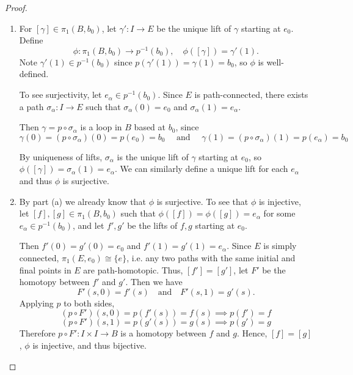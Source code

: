 \documentclass[12pt]{amsart}
\begin{document}
\begin{proof}
    \bbni
    \begin{enumerate}
        \item [(a)] For $[\gamma] \in \pi_1(B, b_0)$, let $\gamma' : I \to E$ be the unique lift of $\gamma$ starting at $e_0$. Define
        \[
            \phi: \pi_1(B, b_0) \to p^{-1}(b_0), \quad \phi([\gamma])
            = \gamma'(1).
        \]
        Note $\gamma'(1) \in p^{-1}(b_0)$ since $p(\gamma'(1)) = \gamma(1)
        = b_0$, so $\phi$ is well-defined.

        

        To see surjectivity, let $e_\alpha \in p^{-1}(b_0)$. Since $E$ is path-connected, there exists a path $\sigma_\alpha: I \to E$ such that $\sigma_\alpha(0) = e_0$ and $\sigma_\alpha(1) = e_\alpha$. 
        
        Then $\gamma = p \circ \sigma_\alpha$ is a loop in $B$ based at $b_0$, since 
        \[\gamma(0) = (p \circ \sigma_\alpha) (0) = p(e_0) = b_0 \quad \text{ and } \quad \gamma(1) = (p \circ \sigma_\alpha) (1) = p(e_\alpha) = b_0\]
       
        By uniqueness of lifts, $\sigma_\alpha$ is the unique lift of $\gamma$ starting at $e_0$, so $\phi([\gamma]) = \sigma_\alpha(1) = e_\alpha$. We can similarly define a unique lift for each $e_\alpha$ and thus $\phi$ is surjective.
        
        \item [(b)] 
        By part (a) we already know that $\phi$ is surjective. To see that $\phi$ is injective, let $[f], [g] \in \pi_1(B, b_0)$ such that $\phi([f]) = \phi([g]) = e_\alpha$ for some $e_\alpha \in p^{-1}(b_0)$, and let $f', g'$ be the lifts of $f, g$ starting at $e_0$. 
         
        Then $f'(0) = g'(0) = e_0$ and $f'(1) = g'(1)= e_\alpha$. Since $E$ is simply connected, $\pi_1(E, e_0) \cong \{e\}$, i.e. any two paths with the same initial and final points in $E$ are path-homotopic. Thus, $[f'] = [g']$, let $F'$ be the homotopy between $f'$ and $g'$. Then we have
        \[
            F'(s,0) = f'(s) \quad \text{and} \quad F'(s,1) = g'(s).
        \]
        Applying $p$ to both sides,
        \[
            (p \circ F')(s,0) = p(f'(s)) = f(s) \implies p (f') = f
        \]
        \[
            (p \circ F')(s,1) = p(g'(s)) = g(s)\implies p (g') = g
        \]
        Therefore $p \circ F' : I \times I \to B$ is a homotopy between $f$
        and $g$.
        Hence, $[f] = [g]$, $\phi$ is injective, and thus bijective.
    \end{enumerate}
\end{proof}
\end{document}
